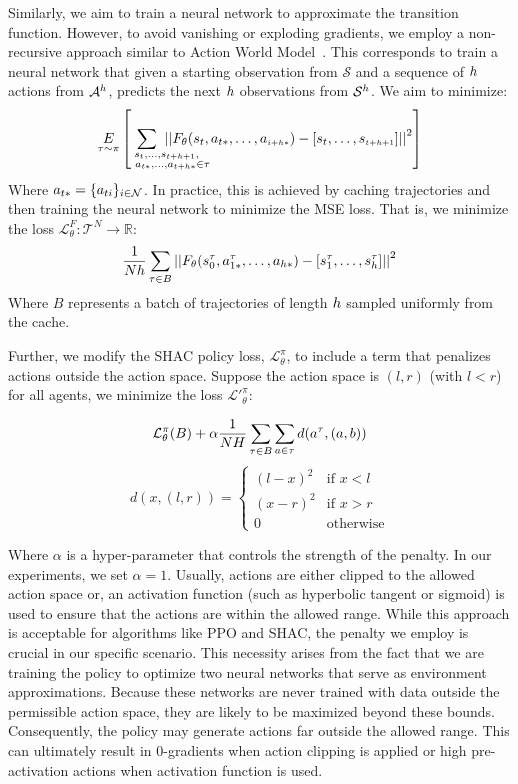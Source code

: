 Similarly, we aim to train a neural network to approximate the transition function. However, to avoid vanishing or exploding gradients, we employ a non-recursive approach similar to Action World Model~\cite{Ma24}. This corresponds to train a neural network that given a starting observation from $\mathcal{S}$ and a sequence of $h$ actions from $\mathcal{A}^h$, predicts the next $h$ observations from $\mathcal{S}^h$. We aim to minimize:
\begin{align*}
    \underset{\tau\sim\pi}{E}\left[\hspace{-1.2cm}\sum_{\scriptscriptstyle \hspace{1cm}\substack{s_t,\dots,s_{t+h+1},\\\hspace{.3cm}a_{t*},\dots,a_{t+h*}\in\tau}}\hspace{-1.2cm} \left\vert\left\vert \transition_{\theta}(s_t, a_{t*},\dots,a_{\scriptscriptstyle i+h*}) - [s_t,\dots,s_{\scriptscriptstyle t+h+1}] \right\vert\right\vert^2\right] 
\end{align*}
Where $a_{t*}=\{a_{ti}\}_{i\in\mathcal{N}}$. In practice, this is achieved by caching trajectories and then training the neural network to minimize the MSE loss. That is, we minimize the loss $\mathcal{L}_\theta^{F}:\mathcal{T}^N\rightarrow\mathbb{R}$:
$$ \frac{1}{Nh}\sum_{\tau \in B}\left|\left| F_{\theta}(s_0^\tau, a_{1*}^\tau, \dots, a_{h*}) - \left[ s^\tau_1, \dots, s^\tau_h \right] \right|\right|^2 $$
Where $B$ represents a batch of trajectories of length $h$ sampled uniformly from the cache.

Further, we modify the SHAC policy loss, $\mathcal{L}_\theta^{\pi}$, to include a term that penalizes actions outside the action space. Suppose the action space is $(l,r)$ (with $l<r$) for all agents, we minimize the loss $\mathcal{L'}_\theta^\pi:$

$$\mathcal{L}_\theta^\pi(B) + \alpha \frac{1}{NH}\sum_{\tau\in B}\sum_{a\in\tau} d(a^\tau,(a,b))$$
$$d(x,(l,r)) = \begin{cases}(l-x)^2 & \text{if } x < l \\ (x-r)^2 & \text{if } x > r \\ 0 & \text{otherwise} \end{cases}$$

    Where $\alpha$ is a hyper-parameter that controls the strength of the penalty. In our experiments, we set $\alpha=1$. Usually, actions are either clipped to the allowed action space or, an activation function (such as hyperbolic tangent or sigmoid) is used to ensure that the actions are within the allowed range. While this approach is acceptable for algorithms like PPO and SHAC, the penalty we employ is crucial in our specific scenario. This necessity arises from the fact that we are training the policy to optimize two neural networks that serve as environment approximations. Because these networks are never trained with data outside the permissible action space, they are likely to be maximized beyond these bounds. Consequently, the policy may generate actions far outside the allowed range. This can ultimately result in 0-gradients when action clipping is applied or high pre-activation actions when activation function is used. 

